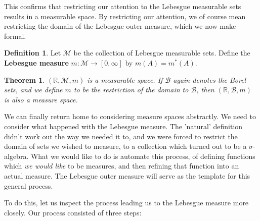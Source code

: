 \documentclass{article}
\theoremstyle{definition}
\newtheorem{definition}{Definition}[section]
\theoremstyle{plain}
\theoremstyle{theorem}
\newtheorem{theorem}{Theorem}[section]
\begin{document}
This confirms that restricting our attention to the Lebesgue measurable sets results in a measurable space. By restricting our attention, we of course mean restricting the domain of the Lebesgue outer measure, which we now make formal.
\begin{definition}
	Let $\mathcal{M}$ be the collection of Lebesgue measurable sets. Define the \textbf{Lebesgue measure} $m: \mathcal{M} \to [0,\infty]$ by $m(A) = m^*(A)$.
\end{definition}
\begin{theorem}
	$(\mathbb{R},\mathcal{M},m)$ is a measurable space. If $\mathcal{B}$ again denotes the Borel sets, and we define $m$ to be the restriction of the domain to $\mathcal{B}$, then $(\mathbb{R},\mathcal{B},m)$ is also a measure space.
\end{theorem}
We can finally return home to considering measure spaces abstractly. We need to consider what happened with the Lebesgue measure. The 'natural' definition didn't work out the way we needed it to, and we were forced to restrict the domain of sets we wished to measure, to a collection which turned out to be a $\sigma$-algebra. What we would like to do is automate this process, of defining functions which \textit{we would like} to be measures, and then refining that function into an actual measure. The Lebesgue outer measure will serve as the template for this general process. \par 
To do this, let us inspect the process leading us to the Lebesgue measure more closely. Our process consisted of three steps:
\end{document}
